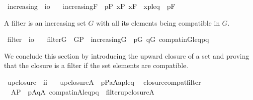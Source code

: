 \begin{isabellebody}
\isanewline
{}\isamarkupfalse%
\ increasing\ {\isacharcolon}{\isacharcolon}\ {\isachardoublequoteopen}i{\isasymRightarrow}o{\isachardoublequoteclose}\ \isanewline
\ \ {\isachardoublequoteopen}increasing{\isacharparenleft}F{\isacharparenright}\ {\isacharequal}{\isacharequal}\ {\isasymforall}p{\isasymin}P{\isachardot}\ {\isasymforall}x{\isasymin}P{\isachardot}\ x{\isasymin}F\ {\isasymand}\ {\isasymlangle}x{\isacharcomma}p{\isasymrangle}{\isasymin}leq\ {\isasymlongrightarrow}\ p{\isasymin}F{\isachardoublequoteclose}\isanewline
\end{isabellebody}
A filter is an increasing set $G$ with all its elements being compatible in $G$.
\begin{isabellebody}
\isanewline
{}\isamarkupfalse%
\ filter\ {\isacharcolon}{\isacharcolon}\ {\isachardoublequoteopen}i{\isasymRightarrow}o{\isachardoublequoteclose}\ \isanewline
\ \ {\isachardoublequoteopen}filter{\isacharparenleft}G{\isacharparenright}\ {\isacharequal}{\isacharequal}\ G{\isasymsubseteq}P\ {\isasymand}\ increasing{\isacharparenleft}G{\isacharparenright}\ {\isasymand}\ {\isacharparenleft}{\isasymforall}p{\isasymin}G{\isachardot}\ {\isasymforall}q{\isasymin}G{\isachardot}\ compat{\isacharunderscore}in{\isacharparenleft}G{\isacharcomma}leq{\isacharcomma}p{\isacharcomma}q{\isacharparenright}{\isacharparenright}{\isachardoublequoteclose}\isanewline
\end{isabellebody}

We conclude this section by introducing the upward closure of a set
and proving that the closure is a filter if the set elements are
compatible.
\begin{isabellebody}
\isanewline
{}\isamarkupfalse%
\ upclosure\ {\isacharcolon}{\isacharcolon}\ {\isachardoublequoteopen}i{\isasymRightarrow}i{\isachardoublequoteclose}\ \isanewline
\ \ {\isachardoublequoteopen}upclosure{\isacharparenleft}A{\isacharparenright}\ {\isacharequal}{\isacharequal}\ {\isacharbraceleft}p{\isasymin}P{\isachardot}{\isasymexists}a{\isasymin}A{\isachardot}{\isasymlangle}a{\isacharcomma}p{\isasymrangle}{\isasymin}leq{\isacharbraceright}{\isachardoublequoteclose}\isanewline
{}\isamarkupfalse%
\ \ closure{\isacharunderscore}compat{\isacharunderscore}filter{\isacharcolon}\isanewline
\ \ {\isachardoublequoteopen}A{\isasymsubseteq}P\ {\isasymLongrightarrow}\ {\isacharparenleft}{\isasymforall}p{\isasymin}A{\isachardot}{\isasymforall}q{\isasymin}A{\isachardot}\ compat{\isacharunderscore}in{\isacharparenleft}A{\isacharcomma}leq{\isacharcomma}p{\isacharcomma}q{\isacharparenright}{\isacharparenright}\ {\isasymLongrightarrow}\ filter{\isacharparenleft}upclosure{\isacharparenleft}A{\isacharparenright}{\isacharparenright}{\isachardoublequoteclose}\isanewline
\end{isabellebody}



